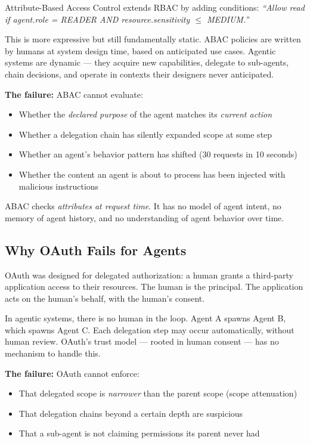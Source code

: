 \documentclass[12pt, a4paper]{article}
\begin{document}
Attribute-Based Access Control extends RBAC by adding conditions:
\textit{``Allow read if agent.role = READER AND resource.sensitivity $\leq$ MEDIUM.''}

This is more expressive but still fundamentally static. ABAC policies are written
by humans at system design time, based on anticipated use cases. Agentic systems
are dynamic — they acquire new capabilities, delegate to sub-agents, chain
decisions, and operate in contexts their designers never anticipated.

\textbf{The failure:} ABAC cannot evaluate:
\begin{itemize}[noitemsep]
  \item Whether the \textit{declared purpose} of the agent matches its \textit{current action}
  \item Whether a delegation chain has silently expanded scope at some step
  \item Whether an agent's behavior pattern has shifted (30 requests in 10 seconds)
  \item Whether the content an agent is about to process has been injected with malicious instructions
\end{itemize}

ABAC checks \textit{attributes at request time}. It has no model of agent intent,
no memory of agent history, and no understanding of agent behavior over time.

\subsection{Why OAuth Fails for Agents}

OAuth was designed for delegated authorization: a human grants a third-party
application access to their resources. The human is the principal. The
application acts on the human's behalf, with the human's consent.

In agentic systems, there is no human in the loop. Agent A spawns Agent B,
which spawns Agent C. Each delegation step may occur automatically, without
human review. OAuth's trust model — rooted in human consent — has no mechanism
to handle this.

\textbf{The failure:} OAuth cannot enforce:
\begin{itemize}[noitemsep]
  \item That delegated scope is \textit{narrower} than the parent scope (scope attenuation)
  \item That delegation chains beyond a certain depth are suspicious
  \item That a sub-agent is not claiming permissions its parent never had
\end{itemize}
\end{document}
